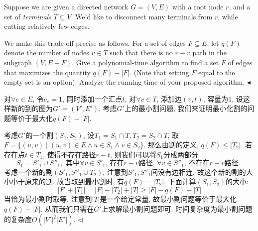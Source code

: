 \documentclass[11pt]{article}
\newenvironment{problem}[2][Problem]{\begin{trivlist}
    \item[\hskip \labelsep{\bfseries#1}\hskip\labelsep{\bfseries#2.}]\mbox{}\newline}{\hfill$\blacktriangleleft$\end{trivlist}}
\newenvironment{answer}[1][Answer]{\begin{trivlist}
\item[\hskip \labelsep{\bfseries\itshape#1.}\hskip \labelsep]}{\hfill$\lhd$\end{trivlist}}
\begin{document}
\begin{problem}{3. (Flow Disconnecting with Multiple Terminals)}
    Suppose we are given a directed network $G = (V, E)$ with a root node $r$, and a set of \textit{terminals} $T \subseteq V$. We'd like to disconnect many terminals from $r$, while cutting relatively few edges.

    We make this trade-off precise as follows. For a set of edges $F \subseteq E$, let $q(F)$ denote the number of nodes $v \in T$ such that there is no $r-v$ path in the subgraph $(V, E-F)$. Give a polynomial-time algorithm to find a set $F$ of edges that maximizes the quantity $q(F)-|F|$. (Note that setting $F$ equal to the empty set is an option). Analyze the running time of your proposed algorithm.    
\end{problem}
\begin{answer}
    对$\forall e \in E$, 令$c_e = 1$, 同时添加一个汇点$t$, 对$\forall v \in T$, 添加边$(v,t)$, 容量为1, 设这样新的到的图为$G'=(V',E')$. 考虑$G'$上的最小割问题, 我们来证明最小化割的问题等价于最大化$q(F) - |F|$.

    考虑$G'$的一个割$(S_1, S_2)$, 设$T_1 = S_1 \cap T, T_2 = S_2 \cap T$, 取$F = \{(u,v)\mid (u,v)\in E \land u \in S_1\land v\in S_2\}$. 那么由割的定义, $q(F) \le |T_2|$. 若存在点$t \in T_1$, 使得不存在路径$r-t$, 则我们可以将$S_1$分成两部分
    \[
    S_1 = S'_1 \cup S''_1, \text{ 其中$\forall v \in S'_1$, 存在$r-v$路径, $\forall v \in S''_1$, 不存在$r-v$路径. }
    \]
    考虑一个新的割$(S'_1, S''_1 \cup T_2)$, 注意到$S'_1,S''_1$间没有边相连, 故这个新的割的大小小于原来的割. 故当取到最小割时, 有$q(F) = |T_2|$. 下面计算$(S_1, S_2)$的大小:
    \[
    |F| + |T_1| = |F| - |T_2| + |T| \ge |F|- q(F) + |T|
    \]
    当恰为最小割时取等. 注意到$|T|$是一个给定常量, 故最小割问题等价于最大化$q(F) - |F|$. 从而我们只需在$G'$上求解最小割问题即可. 时间复杂度为最小割问题的复杂度$O(|V'|^2|E'|)$.
\end{answer}
\end{document}
